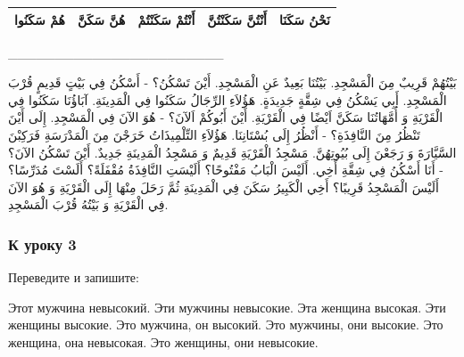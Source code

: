 \documentclass[a5paper]{article}
\begin{document}
\begin{center}
\tablefirsthead{}
\tablehead{}
\tabletail{}
\tablelasttail{}
\begin{supertabular}{|m{1.1712599in}|m{1.1712599in}|m{1.2962599in}|m{1.4212599in}|m{1.3170599in}|}
\hline
هُمْ سَكَنُوا &
هُنَّ سَكَنَّ &
أَنْتُمْ سَكَنْتُمْ &
أَنْتُنَّ سَكَنْتُنَّ &
نَحْنُ سَكَنَا\\\hline
\end{supertabular}
\end{center}
\_\_\_\_\_\_\_\_\_\_\_\_\_\_\_\_\_\_\_\_\_\_\_

بَيْتُهُمْ قَرِيبٌ مِنَ الْمَسْجِدِ. بَيْتُنَا بَعِيدٌ عَنِ الْمَسْجِدِ. أَيْنَ تَسْكُنُ؟ - أَسْكُنُ فِي بَيْتٍ قَدِيمٍ قُرْبَ الْمَسْجِدِ. أَبِي يَسْكُنُ فِي شِقَّةٍ جَدِيدَةٍ. هَؤُلاَءِ الرِّجَالُ سَكَنُوا فِي الْمَدِينَةِ. آبَاؤُنَا سَكَنُوا فِي الْقَرْيَةِ وَ أُمَّهَاتُنَا سَكَنَّ اَيْضًا فِي الْقَرْيَةِ. أَيْنَ أَبُوكُمْ اَلآنَ؟ - هُوَ الآنَ فِي الْمَسْجِدِ. إِلَى أَيْنَ تَنْظُرُ مِنَ النَّافِذَةِ؟ - أَنْظُرُ إِلَى بُسْتَانِنَا. هَؤُلاَءِ التِّلْمِيذَاتُ خَرَجْنَ مِنَ الْمَدْرَسَةِ فَرَكِبْنَ السَّيَّارَةَ وَ رَجَعْنَ إِلَى بُيُوتِهُنَّ. مَسْجِدُ الْقَرْيَةِ قَدِيمٌ وَ مَسْجِدُ الْمَدِينَةِ جَدِيدٌ. أَيْنَ تَسْكُنُ الآنَ؟ - أَنَا أَسْكُنُ فِي شِقَّةِ أَخِي. أَلَيْسَ الْبَابُ مَفْتُوحًا؟ أَلَيْسَتِ النَّافِذَةُ مُقْفَلَةً؟ أَلَسْتَ مُدَرِّسًا؟ أَلَيْسَ الْمَسْجِدُ قَرِيبًا؟ أَخِي الْكَبِيرُ سَكَنَ فِي الْمَدِينَةِ ثُمَّ رَحَلَ مِنْهَا إِلَى الْقَرْيَةِ وَ هُوَ الآنَ فِي الْقَرْيَةِ وَ بَيْتُهُ قُرْبَ الْمَسْجِدِ.

\subsubsection[К уроку 3]{К уроку 3}
Переведите и запишите:

Этот мужчина невысокий. Эти мужчины невысокие. Эта женщина высокая. Эти женщины высокие. Это мужчина, он высокий. Это мужчины, они высокие. Это женщина, она невысокая. Это женщины, они невысокие.
\end{document}
